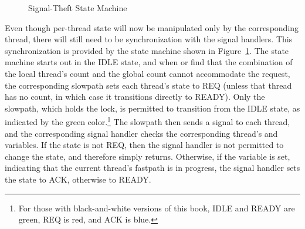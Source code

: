 \begin{figure}[tb]
\begin{center}
\end{center}
\caption{Signal-Theft State Machine}
\label{fig:count:Signal-Theft State Machine}
\end{figure}

Even though per-thread state will now be manipulated only by the
corresponding thread, there will still need to be synchronization
with the signal handlers.
This synchronization is provided by the state machine shown in
Figure~\ref{fig:count:Signal-Theft State Machine}.
The state machine starts out in the IDLE state, and when 
or  find that the combination of the local thread's count
and the global count cannot accommodate the request, the corresponding
slowpath sets each thread's  state to REQ (unless that thread
has no count, in which case it transitions directly to READY).
Only the slowpath, which holds the  lock, is permitted to
transition from the IDLE state, as indicated by the green color.\footnote{
	For those with black-and-white versions of this book,
	IDLE and READY are green, REQ is red, and ACK is blue.}
The slowpath then sends a signal to each thread, and the corresponding
signal handler checks the corresponding thread's  and
 variables.
If the  state is not REQ, then the signal handler is not
permitted to change the state, and therefore simply returns.
Otherwise, if the  variable is set, indicating that
the current thread's fastpath is in progress, the signal handler
sets the  state to ACK, otherwise to READY.


